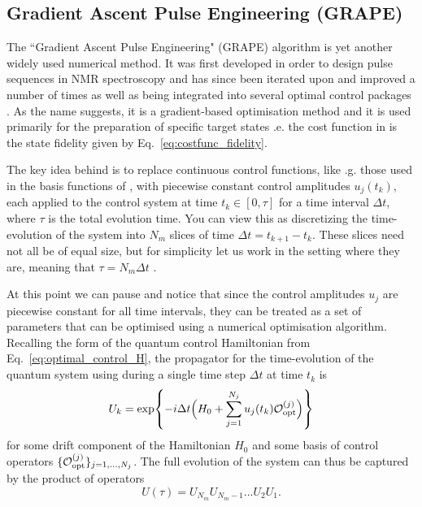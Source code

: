 \subsection{Gradient Ascent Pulse Engineering (GRAPE)}\label{sec:3.3.2_GRAPE}

The ``Gradient Ascent Pulse Engineering" (GRAPE) algorithm is yet another widely used  numerical method. It was first developed in order to design pulse sequences in NMR spectroscopy \cite{khaneja_optimal_2005} and has since been iterated upon and improved a number of times as well as being integrated into several optimal control packages \cite{de_fouquieres_second_2011, chen_iterative_2022, machnes_comparing_2011, johansson_qutip_2013}. As the name suggests, it is a gradient-based optimisation method and it is used primarily for the preparation of specific target states \@i.e. the cost function in is the state fidelity given by Eq.~\eqref{eq:costfunc_fidelity}.

The key idea behind  is to replace continuous control functions, like \@e.g. those used in the basis functions of , with piecewise constant control amplitudes $u_j(t_k)$, each applied to the control system at time $t_k \in [0, \tau]$ for a time interval $\Delta t$, where $\tau$ is the total evolution time. You can view this as discretizing the time-evolution of the system into $N_m$ slices of time $\Delta t = t_{k + 1} - t_k$. These slices need not all be of equal size, but for simplicity let us work in the setting where they are, meaning that $\tau = N_m \Delta t$ . 

At this point we can pause and notice that since the control amplitudes $u_j$ are piecewise constant for all time intervals, they can be treated as a set of parameters that can be optimised using a numerical optimisation algorithm. Recalling the form of the quantum control Hamiltonian from Eq.~\eqref{eq:optimal_control_H}, the propagator for the time-evolution of the quantum system using  during a single time step $\Delta t$ at time $t_k$ is
\begin{equation}
    U_k = \exp{- i \Delta t \Big( H_0 + \sum_{j=1}^{N_j} u_j(t_k) \mathcal{O}_{\rm opt}^{(j)} \Big)}
\end{equation}
for some drift component of the Hamiltonian $H_0$ and some basis of control operators $\{\mathcal{O}_{\rm opt}^{(j)}\}_{j = 1,...,N_j}$. The full evolution of the system can thus be captured by the product of operators
\begin{equation}
    U(\tau) = U_{N_m} U_{N_m - 1} ... U_{2} U_{1}.
\end{equation}


